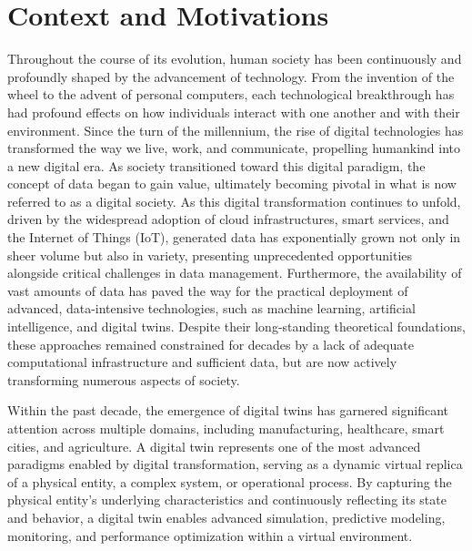 \section*{Context and Motivations}

Throughout the course of its evolution, human society has been continuously and profoundly shaped by the advancement of technology.
%
From the invention of the wheel to the advent of personal computers, each technological breakthrough has had profound effects on how individuals interact with one another and with their environment.
%
Since the turn of the millennium, the rise of digital technologies has transformed the way we live, work, and communicate, propelling humankind into a new digital era.
%
As society transitioned toward this digital paradigm, the concept of data began to gain value, ultimately becoming pivotal in what is now referred to as a digital society.
%
As this digital transformation continues to unfold, driven by the widespread adoption of cloud infrastructures, smart services, and the Internet of Things (IoT), generated data has exponentially grown  not only in sheer volume but also in variety, presenting unprecedented opportunities alongside critical challenges in data management.
%
Furthermore, the availability of vast amounts of data has paved the way for the practical deployment of advanced, data-intensive technologies, such as machine learning, artificial intelligence, and digital twins.
%
Despite their long-standing theoretical foundations, these approaches remained constrained for decades by a lack of adequate computational infrastructure and sufficient data, but are now actively transforming numerous aspects of society.

Within the past decade, the emergence of digital twins has garnered significant attention across multiple domains, including manufacturing, healthcare, smart cities, and agriculture.
%
A digital twin represents one of the most advanced paradigms enabled by digital transformation, serving as a dynamic virtual replica of a physical entity, a complex system, or operational process.
%
By capturing the physical entity's underlying characteristics and continuously reflecting its state and behavior, a digital twin enables advanced simulation, predictive modeling, monitoring, and performance optimization within a virtual environment.

